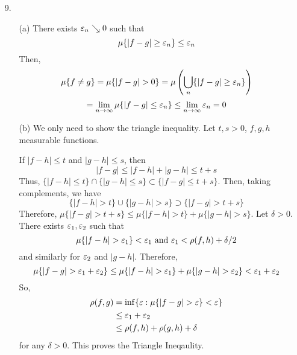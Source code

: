 \begin{itemize}
\begin{itemize}
		\item[(b)]
		\begin{proof}For any $f \in C[-\pi,\pi]$, $n \in \bbn$,
		\begin{align*}
			\left| \int_{-\pi}^\pi \dfrac{x^n}{\pi^n} f(x)\, dx \right|^2 &\le \int_{-\pi}^\pi \dfrac{x^{2n}}{\pi^{2n}} \, dx \int_{-\pi}^\pi |f(x)|^2 \, dx \\
			&= \dfrac{\pi^{2n+1}-(-\pi)^{2n+1}}{(2n+1)\pi^{2n}} \|f\|_{L^2}^2 \\
			&= \dfrac{2\pi}{2n+1} \|f\|_{L^2}^2
		\end{align*}
		which goes to $0$ as $n \to \infty$.
		\end{proof}
	\end{itemize}
    
\item[9.]
    \begin{itemize}
        \item[(a)] There exists $\varepsilon_n \searrow 0$ such that
            \[ \mu\{ |f-g| \ge \varepsilon_n\} \le \varepsilon_n \]
        Then,
            \[ \mu\{f \ne g\} = \mu\{|f-g| >0\} = \mu \left(\bigcup_n \{ |f-g| \ge \varepsilon_n\} \right) \]
            \[= \lim_{n \to \infty} \mu\{|f-g| \le \varepsilon_n\} \le \lim_{n \to \infty} \varepsilon_n =0 \]
        \item[(b)] We only need to show the triangle inequality. Let $t,s >0$, $f,g,h$ measurable functions.
            
        If $|f-h| \le t$ and $|g-h| \le s$, then
	        \[ |f-g| \le |f-h|+|g-h| \le t+s \]
        Thus, $\{|f-h| \le t\} \cap \{|g-h| \le s\} \subset \{|f-g| \le t+s\}$. Then, taking complements, we have
	        \[ \{|f-h| > t\} \cup \{|g-h| > s\} \supset \{ |f-g| > t+s\} \]
        Therefore, $\mu\{|f-g| > t+s\} \le \mu\{|f-h| >t\} + \mu\{|g-h| >s\}$. Let $\delta>0$. There exists $\varepsilon_1,\varepsilon_2$ such that
            \[\mu\{|f-h| > \varepsilon_1\} < \varepsilon_1 \mbox{ and } \varepsilon_1 < \rho(f,h)+\delta/2 \]
        and similarly for $\varepsilon_2$ and $|g-h|$. Therefore,
            \[ \mu\{|f-g| > \varepsilon_1+\varepsilon_2\}\le \mu\{|f-h| >\varepsilon_1\} + \mu\{|g-h| >\varepsilon_2\} < \varepsilon_1+\varepsilon_2 \]
        So,
            \begin{align*} \rho(f,g) &= \inf\{ \varepsilon : \mu\{|f-g| >\varepsilon\} < \varepsilon \} \\
            &\le \varepsilon_1+\varepsilon_2 \\
            &\le \rho(f,h)+\rho(g,h) +\delta
            \end{align*}
        for any $\delta>0$. This proves the Triangle Ineqaulity.
    \end{itemize}
\end{itemize}
